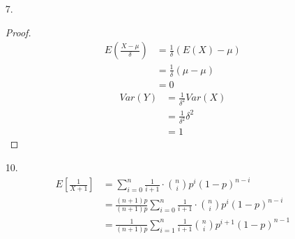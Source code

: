 \documentclass{article}
\begin{document}
\begin{itemize}
  \begin{proof}
    Apply the fact we just proved with $a_i=1$ for all $i$.
    \[\sum_{i=1}^{\infty}P(N \geq i) = \sum_{i=1}^{\infty}1 \cdot P(N
      \geq i)= \sum_{i=1}^\infty\underbrace{(1+\ldots+1)}_{i}P(N=i) =
      \sum_{i=1}^niP(N=i) = E(N)\].
  \end{proof}
  \begin{proof}
    Apply it with $a_i = i$ for all $i$, we get
    \begin{equation*}
      \begin{split}
        \sum_{i=1}^\infty i \cdot P(N\geq i)
        &= \sum_{i=1}^\infty (1 + 2 +  \ldots + i) P(N=i)\\
        &= \sum_{i=1}^\infty \frac{(i+1)i}{2} P(N=i)\\
        &= E(\frac{N(N+1)}{2})
      \end{split}
    \end{equation*}
  \end{proof}
\item [7.]
  \begin{proof}
    \begin{equation*}
      \begin{split}
        E(\frac{X-\mu}{\delta})
        &= \frac{1}{\delta}(E(X)-\mu)\\
        &= \frac{1}{\delta}(\mu-\mu)\\
        &= 0
      \end{split}
    \end{equation*}
    \begin{equation*}
      \begin{split}
        Var(Y)
        &= \frac{1}{\delta^2} Var(X)\\
        &= \frac{1}{\delta^2}\delta^2\\
        &= 1
      \end{split}
    \end{equation*}
  \end{proof}
\item [10.]
  \begin{equation*}
    \begin{split}
      E[\frac{1}{X+1}]
      &= \sum_{i=0}^n\frac{1}{i+1}\cdot {n \choose i} p^i(1-p)^{n-i}\\
      &= \frac{(n+1)p}{(n+1)p} \sum_{i=0}^n\frac{1}{i+1}\cdot {n
        \choose i} p^i(1-p)^{n-i}\\
      &= \frac{1}{(n+1)p}\sum_{i=1}^n\frac{1}{i+1} {n \choose i}
      p^{i+1}(1-p)^{n-1}\\

\end{split}
\end{equation*}
\end{itemize}
\end{document}
